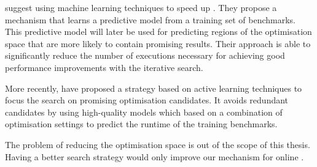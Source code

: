 \cite{agakov06} suggest using machine learning techniques to speed up {\itercomp}.
They propose a mechanism that learns a predictive model from a training set of benchmarks.
This predictive model will later be used for predicting regions of the optimisation space that are more likely to contain promising results.
Their approach is able to significantly reduce the number of executions necessary for achieving good performance improvements with the iterative search.

More recently, \cite{ogilvie17} have proposed a strategy based on active learning techniques to focus the search on promising optimisation candidates.
It avoids redundant candidates 
by using high-quality models which based on a combination of optimisation settings to predict the runtime of the training benchmarks.

The problem of reducing the optimisation space is out of the scope of this thesis.
Having a better search strategy would only improve our mechanism for online {\itercomp}.

